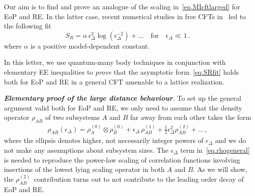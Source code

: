 \documentclass[prl,a4paper,notitlepage,twocolumn,superscriptaddress,longbibliography,reprint]{revtex4-2}
\newcommand{\mysection}[1]{{\vspace{10 pt}\noindent \emph{{\textbf{#1}}.}}}
\begin{document}
Our aim is to find and prove an analogue of the scaling in~\eqref{eq.MIcftlarged} for EoP and RE. In the latter case, recent numerical studies in free CFTs in~\cite{Bueno:2020vnx,Bueno:2020fle} led to the following fit
\begin{equation}
\label{eq.SRfit}
S_{R} =\alpha \, \epsilon_\Delta^{2} \log(\epsilon_\Delta^{-2})+\dots \quad\text{for}\quad \epsilon_{\Delta} \ll 1 \,.
\end{equation}
where $\alpha$ is a positive model-dependent constant.

In this letter, we use quantum-many body techniques in conjunction with elementary EE inequalities to \emph{prove} that the asymptotic form~\eqref{eq.SRfit} holds both for EoP and RE in a general CFT amenable to a lattice realization. %


\mysection{Elementary proof of the large distance behaviour} To set up the general argument valid both for EoP and RE, we only need to assume that the density operator $\rho_{AB}$ of two subsystems $A$ and $B$ far away from each other takes the form
\begin{align}
    \rho_{AB}(\epsilon_{\Delta})=\rho_{A}^{(0)}\otimes\rho^{(0)}_{B}+\epsilon_{\Delta} \, \rho_{AB}^{(1)}+\tfrac{1}{2}\epsilon_{\Delta}^2\rho^{(2)}_{AB} + \ldots\,,\label{eq.rhogeneral}
\end{align}
where the ellipsis denotes higher, not necessarily integer powers of $\epsilon_{\Delta}$ and we do not make any assumptions about subsystem sizes. The $\epsilon_\Delta$ term in~\eqref{eq.rhogeneral} is needed to reproduce the power-law scaling of correlation functions involving insertions of the lowest lying scaling operator in both $A$ and $B$. As we will show, the $\rho_{AB}^{(2)}$~contribution turns out to not contribute to the leading order decay of EoP and RE.
\end{document}
